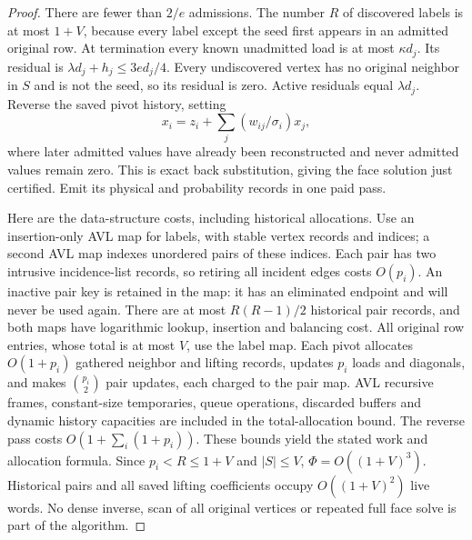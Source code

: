 \begin{proof}
There are fewer than $2/e$ admissions. The number $R$ of discovered labels
is at most $1+V$, because every label except the seed first appears in an
admitted original row. At termination every known unadmitted load is at
most $\kappa d_j$. Its residual is $\lambda d_j+h_j\leq3e d_j/4$.
Every undiscovered vertex has no original neighbor in $S$ and is not the
seed, so its residual is zero. Active residuals equal $\lambda d_j$.
Reverse the saved pivot history, setting
\[
 x_i=z_i+\sum_j(w_{ij}/\sigma_i)x_j,
\]
where later admitted values have already been reconstructed and never
admitted values remain zero. This is exact back substitution, giving the
face solution just certified. Emit its physical and probability records in
one paid pass.

Here are the data-structure costs, including historical allocations.
Use an insertion-only AVL map for labels, with stable vertex records and
indices; a second AVL map indexes unordered pairs of these indices. Each
pair has two intrusive incidence-list records, so retiring all incident
edges costs $O(p_i)$. An inactive pair key is retained in the map: it has
an eliminated endpoint and will never be used again. There are at most
$R(R-1)/2$ historical pair records, and both maps have logarithmic lookup,
insertion and balancing cost. All original row entries, whose total is at
most $V$, use the label map. Each pivot allocates $O(1+p_i)$ gathered
neighbor and lifting records, updates $p_i$ loads and diagonals, and makes
$\binom{p_i}{2}$ pair updates, each charged to the pair map. AVL recursive
frames, constant-size temporaries, queue operations, discarded buffers and
dynamic history capacities are included in the total-allocation bound.
The reverse pass costs $O(1+\sum_i(1+p_i))$. These bounds yield the stated
work and allocation formula. Since $p_i<R\leq1+V$ and $|S|\leq V$,
$\Phi=O((1+V)^3)$. Historical pairs and all saved lifting coefficients
occupy $O((1+V)^2)$ live words. No dense inverse, scan of all original
vertices or repeated full face solve is part of the algorithm.
\end{proof}


